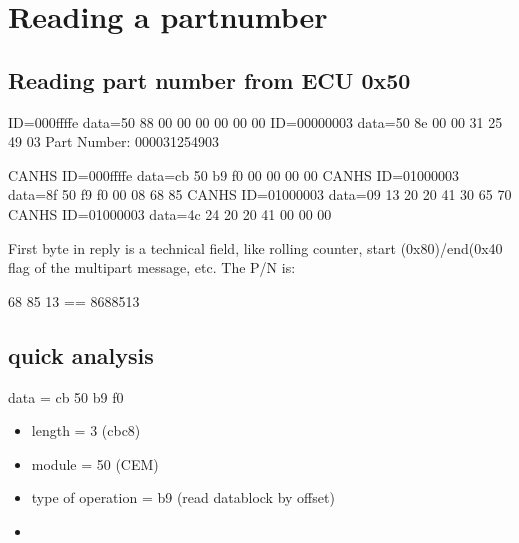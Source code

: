 \documentclass[letterpaper,10pt,english]{sphinxmanual}
\begin{document}
\section{Reading a partnumber}
\label{\detokenize{makingsense/partnumber:reading-a-partnumber}}\label{\detokenize{makingsense/partnumber::doc}}

\subsection{Reading part number from ECU 0x50}
\label{\detokenize{makingsense/partnumber:reading-part-number-from-ecu-0x50}}
\begin{sphinxVerbatim}[commandchars=\\\{\}]
\PYGZhy{}\PYGZhy{}\PYGZhy{}\PYGZgt{} ID=000ffffe data=50 88 00 00 00 00 00 00
\PYGZlt{}\PYGZhy{}\PYGZhy{}\PYGZhy{} ID=00000003 data=50 8e 00 00 31 25 49 03
Part Number: 000031254903
\end{sphinxVerbatim}

\begin{sphinxVerbatim}[commandchars=\\\{\}]
CAN\PYGZus{}HS \PYGZhy{}\PYGZhy{}\PYGZhy{}\PYGZgt{} ID=000ffffe data=cb 50 b9 f0 00 00 00 00
CAN\PYGZus{}HS \PYGZlt{}\PYGZhy{}\PYGZhy{}\PYGZhy{} ID=01000003 data=8f 50 f9 f0 00 08 68 85
CAN\PYGZus{}HS \PYGZlt{}\PYGZhy{}\PYGZhy{}\PYGZhy{} ID=01000003 data=09 13 20 20 41 30 65 70
CAN\PYGZus{}HS \PYGZlt{}\PYGZhy{}\PYGZhy{}\PYGZhy{} ID=01000003 data=4c 24 20 20 41 00 00 00
\end{sphinxVerbatim}

\sphinxAtStartPar
First byte in reply is a technical field, like rolling counter, start (0x80)/end(0x40 flag of the multipart message, etc. The P/N is:

 68 85 13 == 8688513


\subsection{quick analysis}
\label{\detokenize{makingsense/partnumber:quick-analysis}}
\sphinxAtStartPar
data = cb 50 b9 f0
\begin{itemize}
\item {} 
\sphinxAtStartPar
length = 3 (cb\sphinxhyphen{}c8)

\item {} 
\sphinxAtStartPar
module = 50 (CEM)

\item {} 
\sphinxAtStartPar
type of operation = b9 (read datablock by offset)

\item {} 
\end{itemize}
\end{document}
